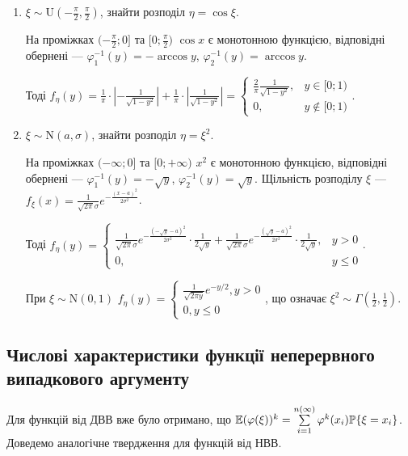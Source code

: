 \begin{example}
    \begin{enumerate}
        \item $\xi \sim \mathrm{U}(-\frac{\pi}{2}, \frac{\pi}{2})$, знайти розподіл $\eta = \cos\xi$.

        На проміжках $(-\frac{\pi}{2}; 0]$ та $[0; \frac{\pi}{2})$ $\cos x$ є монотонною функцією, 
        відповідні обернені --- $\varphi_1^{-1} (y) = -\arccos y$, $\varphi_2^{-1} (y) = \arccos y$.

        Тоді $f_\eta (y) = \frac{1}{\pi} \cdot \left| - \frac{1}{\sqrt{1-y^2}}\right| + \frac{1}{\pi} \cdot \left|\frac{1}{\sqrt{1-y^2}}\right| = \begin{cases}
            \frac{2}{\pi} \frac{1}{\sqrt{1-y^2}}, & y \in [0; 1) \\
            0, & y \notin [0; 1)
        \end{cases}$.
        \item\label{ex:squared_norm_distr} $\xi \sim \mathrm{N}(a, \sigma)$, знайти розподіл $\eta = \xi^2$.

        На проміжках $(-\infty; 0]$ та $[0; +\infty)$ $x^2$ є монотонною функцією, 
        відповідні обернені --- $\varphi_1^{-1} (y) = -\sqrt{y}$, $\varphi_2^{-1} (y) = \sqrt{y}$.
        Щільність розподілу $\xi$ --- $f_\xi (x) = \frac{1}{\sqrt{2\pi}\sigma} e^{-\frac{(x-a)^2}{2\sigma^2}}$.

        Тоді $f_\eta (y) = \begin{cases}
            \frac{1}{\sqrt{2\pi}\sigma} e^{-\frac{(-\sqrt{y}-a)^2}{2\sigma^2}} \cdot \frac{1}{2\sqrt{y}} + 
        \frac{1}{\sqrt{2\pi}\sigma} e^{-\frac{(\sqrt{y}-a)^2}{2\sigma^2}} \cdot \frac{1}{2\sqrt{y}}, & y > 0 \\
        0, & y \leq 0
        \end{cases}$.

        При $\xi \sim \mathrm{N}(0, 1)$ $f_\eta(y) = \begin{cases}
            \frac{1}{\sqrt{2\pi y}} e^{-y/2}, y > 0 \\
            0, y \leq 0
        \end{cases}$, що означає $\xi^2 \sim \Gamma(\frac{1}{2}, \frac{1}{2})$.
    \end{enumerate}
\end{example}

\subsection{Числові характеристики функції неперервного випадкового аргументу}
Для функцій від ДВВ вже було отримано, що
$\mathbb{E}(\varphi(\xi))^k = \sum\limits_{i=1}^{n(\infty)} \varphi^k(x_i) \mathbb{P}\{\xi = x_i\}$.
Доведемо аналогічне твердження для функцій від НВВ.

